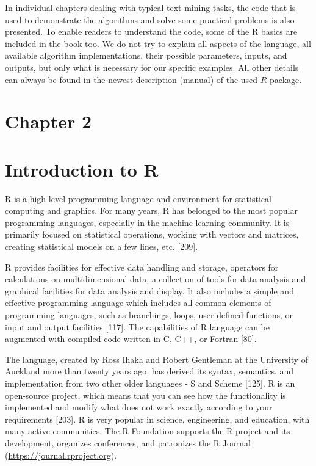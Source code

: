 \documentclass[10pt]{book}
\begin{document}
In individual chapters dealing with typical text mining tasks, the code that is used to demonstrate the algorithms and solve some practical problems is also presented. To enable readers to understand the code, some of the R basics are included in the book too. We do not try to explain all aspects of the language, all available algorithm implementations, their possible parameters, inputs, and outputs, but only what is necessary for our specific examples. All other details can always be found in the newest description (manual) of the used $R$ package.

\section*{Chapter 2}
\section*{Introduction to R}
R is a high-level programming language and environment for statistical computing and graphics. For many years, R has belonged to the most popular programming languages, especially in the machine learning community. It is primarily focused on statistical operations, working with vectors and matrices, creating statistical models on a few lines, etc. [209].

R provides facilities for effective data handling and storage, operators for calculations on multidimensional data, a collection of tools for data analysis and graphical facilities for data analysis and display. It also includes a simple and effective programming language which includes all common elements of programming languages, such as branchings, loops, user-defined functions, or input and output facilities [117]. The capabilities of R language can be augmented with compiled code written in C, C++, or Fortran [80].

The language, created by Ross Ihaka and Robert Gentleman at the University of Auckland more than twenty years ago, has derived its syntax, semantics, and implementation from two other older languages - S and Scheme [125]. R is an open-source project, which means that you can see how the functionality is implemented and modify what does not work exactly according to your requirements [203]. R is very popular in science, engineering, and education, with many active communities. The R Foundation supports the R project and its development, organizes conferences, and patronizes the R Journal (\href{https://journal.rproject.org}{https://journal.rproject.org}).
\end{document}
